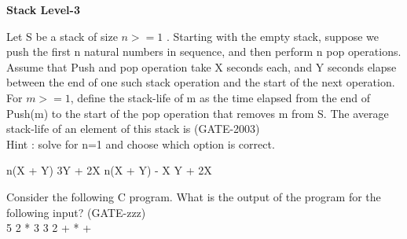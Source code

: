 
\centerline{\textbf{ \LARGE Stack Level-3}}

\begin{questyle}
  \question  Let S be a stack of size \(n >= 1\) . Starting with the empty stack, suppose we push the first n natural
            numbers in sequence, and then perform n pop operations. Assume that Push and pop operation take X seconds
            each, and Y seconds elapse between the end of one such stack operation and the start of the next operation.
            For \( m >= 1 \), define the stack-life of m as the time elapsed from the end of Push(m) to the start of the pop
            operation that removes m from S. The average stack-life of an element of this stack is  (GATE-2003) \\
            Hint : solve for n=1 and choose which option is correct.

  \begin{choices}
    \choice         n(X + Y)
    \choice         3Y + 2X
    \CorrectChoice  n(X + Y) - X
    \choice         Y + 2X
  \end{choices}
\end{questyle}




\begin{questyle}
  \question  Consider the following C program. What is the output of the program for the following input? (GATE-zzz) \\
             5 2 * 3 3 2 + * +
  

  \begin{choices}
  \end{choices}
\end{questyle}
